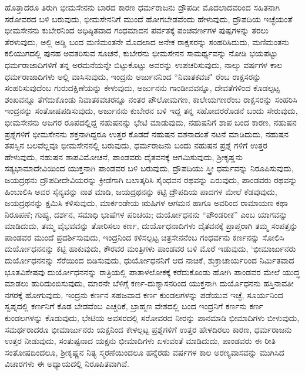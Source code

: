 ಹೊತ್ತಾದರೂ ತಿರುಗಿ ಭೀಮಸೇನನು ಬಾರದ ಕಾರಣ ಧರ್ಮರಾಜನು ದ್ರೌಪದೀ ಮೊದಲಾದವರಿಂದ ಸಹಿತನಾಗಿ ಸರೋವರದ ಬಳಿ ಬರುವುದು, ಭೀಮಸೇನನಿಗೆ ಮುಂದೆ ಹೋಗಬೇಡವೆಂದು ಹೇಳುವುದು, ದ್ರೌಪದಿಯ ಇಚ್ಛೆಯಂತೆ ಭೀಮಸೇನನು ಕುಬೇರನಿಂದ ಅಧಿಷ್ಠಿತವಾದ ಗಂಧಮಾದನ ಪರ್ವತಕ್ಕೆ ಪಂಚವರ್ಣಗಳ ಪುಷ್ಪಗಳನ್ನು ತರಲು ತೆರಳುವುದು, ಅಲ್ಲಿ ಅಡ್ಡಿ ಬಂದ ಮಣಿಮಂತನೇ ಮೊದಲಾದ ಅನೇಕ ರಾಕ್ಷಸರನ್ನು ಸಂಹರಿಸಿದುದು, ಮಣಿಮಂತನು ಕಲಿಯುಗದಲ್ಲಿ ಪುನಹ ಅವತರಿಸುವ ಸೂಚನೆ, ಕುಬೇರನು ಭೀಮಸೇನನ ಸಾಮರ್ಥ್ಯವನ್ನು ನೋಡಿ ಭಯಪಟ್ಟು ಧರ್ಮರಾಜಾದಿಗಳಿಗೆ ತನ್ನ ಅರಮನೆಯನ್ನೇ ಬಿಟ್ಟುಕೊಟ್ಟು ಅವರನ್ನು ಉಪಚರಿಸುವುದು, ನಾಲ್ಕು ವರ್ಷಗಳ ಕಾಲ ಧರ್ಮರಾಜಾದಿಗಳು ಅಲ್ಲಿ ವಾಸಿಸುವುದು, ಇಂದ್ರನು ಅರ್ಜುನನಿಂದ “ನಿವಾತಕವಚ" ರೆಂಬ ರಾಕ್ಷಸರನ್ನು ಸಂಹರಿಸುವುದೆಂಬ ಗುರುದಕ್ಷಿಣೆಯನ್ನು ಕೇಳುವುದು, ಅರ್ಜುನನು ಗಾಂಡೀವವನ್ನೂ, ದೇವತೆಗಳಿಂದ ಕೊಡಲ್ಪಟ್ಟ ಶಂಖವನ್ನೂ ತೆಗೆದುಕೊಂಡು ನಿವಾತಕವಚರನ್ನೂ ನಂತರ ಪೌಲೋಮಗಣ, ಕಾಲೇಯಗಣರೆಂಬ ರಾಕ್ಷಸರನ್ನು ಸಂಹರಿಸಿ ಇಂದ್ರನನ್ನು ಸಂತೋಷಪಡಿಸುವುದು, ಅರ್ಜುನನು ಕುಬೇರನ ಬಳಿ ಇದ್ದ ತನ್ನ ಸಹೋದರರೊಡನೆ ಬಂದು ಸೇರುವುದು, ಭೀಮಸೇನನು ಅಜಗರ ರೂಪದಲ್ಲಿದ್ದ ನಹುಷನನ್ನು ಭೇಟಿ ಮಾಡುವುದು, ನಹುಷನಿಗೆ ಶಾಪ ಬಂದ ಕಾರಣ, ನಹುಷನ ಪ್ರಶ್ನೆಗಳಿಗೆ ಭೀಮಸೇನನು ಶಕ್ತನಾಗಿದ್ದರೂ ಉತ್ತರ ಕೊಡದೆ ನಹುಷನ ವಶನಾದಂತೆ ನಟನೆ ಮಾಡಿದುದು, ನಹುಷನ ತಪಸ್ಸಿನ ಬಲವೆಲ್ಲವೂ ಭೀಮಸೇನನಲ್ಲಿ ಬರುವುದು, ಧರ್ಮರಾಜನು ಬಂದು ನಹುಷನ ಪ್ರಶ್ನೆ ಗಳಿಗೆ ಉತ್ತರ ಹೇಳುವುದು, ನಹುಷನ ಶಾಪವಿಮೋಚನೆ, ಪಾಂಡವರು ದೈತವನಕ್ಕೆ ಆಗಮಿಸುವುದು, ಶ‍್ರೀಕೃಷ್ಣನು ಸತ್ಯಭಾಮಾದೇವಿಯಿಂದ ಯುಕ್ತನಾಗಿ ಪಾಂಡವರ ಬಳಿ ಬರುವುದು, ದ್ರೌಪದಿಯು ಸ್ತ್ರೀ ಧರ್ಮವನ್ನು ನಿರೂಪಿಸುವುದು, ಜಯದ್ರಥನು ದ್ರೌಪದೀದೇವಿಯರನ್ನು ಕ್ರೀಡೆಗಾಗಿ ಬಲಾತ್ಕರಿಸಿ ಸೈಂಧವನ ರಥವನ್ನು ಏರುವುದು, ಪಾಂಡವರು ರಥವನ್ನು ಹಿಂಬಾಲಿಸಿ ಅವರ ಸೈನ್ಯವನ್ನು ನಾಶ ಮಾಡಿ, ಜಯದ್ರಥನನ್ನು ಕಟ್ಟಿ ದ್ರೌಪದಿಯ ಪಾದಗಳ ಮೇಲೆ ಕೆಡವುವುದು, ಜಯದ್ರಥನನ್ನು ಕ್ಷಮಿಸಿ ಕಳಿಸುವುದು, ಮಾರ್ಕಂಡೇಯ ಋಷಿಗಳ ಆಗಮನ ಹಾಗೂ ಅವರಿಂದ ರಾಮಾಯಣ ಕಥಾ ನಿರೂಪಣೆ; ಗುಹ್ಯ, ದರ್ಶನ, ಸಮಾಧಿ ಭಾಷೆಗಳ ಪರಿಚಯ; ದುರ್ಯೋಧನನು “ಪೌಂಡರೀಕ” ಎಂಬ ಯಾಗವನ್ನು ಮಾಡಿದುದು, ತಮ್ಮ ವೈಭವವನ್ನು ತೋರಿಸಲು ಕರ್ಣ, ದುರ್ಯೊಧನಾದಿಗಳು ದೈತವನಕ್ಕೆ ಪ್ರಾಪ್ತರಾಗಿ ತಮ್ಮ ಸಂಪತ್ತನ್ನು ಪಾಂಡವರ ಮುಂದೆ ಪ್ರದರ್ಶಿಸುವುದು, ಇಂದ್ರನಿಂದ ಕಳಿಸಲ್ಪಟ್ಟ ಚಿತ್ರಸೇನನೆಂಬ ಗಂಧರ್ವನು ಕರ್ಣನನ್ನು ಸೋಲಿಸಿ ದುರ್ಯೋಧನನನ್ನು ಕಟ್ಟಿ ಹಾಕುವುದು, ಕೌರವರ ಮಂತ್ರಿಗಳು ಪಾಂಡವರ ಬಳಿ ಮೊರೆ ಇಡುವುದು, `ಭೀಮಾರ್ಜುನರು ದುರ್ಯೋಧನನನ್ನು ಸೆರೆಯಿಂದ ಬಿಡಿಸುವುದು, ಧುರ್ಯೋಧನನಿಗೆ ಆದ ನಾಚಿಕೆ, ಶುಕ್ರಾಚಾರ್ಯರಿಂದ ನಿರ್ಮಿತವಾದ ಭೂತವಿಶೇಷವು ದುರ್ಯೋಧನನನ್ನು ರಾತ್ರಿಯಲ್ಲಿ ಪಾತಾಳಲೋಕಕ್ಕೆ ಕರೆದುಕೊಂಡು ಹೋಗಿ ಪಾಂಡವರ ಮೇಲೆ ಯುದ್ಧ ಮಾಡಲು ಹುರಿದುಂಬಿಸುವುದು, ಮಾರನೇ ಬೆಳಿಗ್ಗೆ ಕರ್ಣ-ದುಶ್ಯಾಸನರಿಂದ ಯುಕ್ತನಾಗಿ ದುರ್ಯೊಧನನು ಹಸ್ತಿನಾವತೀ ನಗರಕ್ಕೆ ಹೋಗುವುದು, ಇಂದ್ರನು ಕರ್ಣನ ಸಹಜವಾದ ಕರ್ಣ ಕುಂಡಲಗಳನ್ನು ಪಡೆಯುವ ಇಚ್ಛೆ, ಸೂರ್ಯನಿಂದ ಸ್ವಪ್ನದಲ್ಲಿ ಕರ್ಣನಿಗೆ ಕೊಡ ಬೇಡವೆಂಬ ಎಚ್ಚರಿಕೆ, ಬ್ರಾಹ್ಮಣ ವೇಶದಲ್ಲಿ ಬಂದ ಇಂದ್ರನಿಗೆ ಕರ್ಣನು ಕರ್ಣ ಕುಂಡಲಗಳನ್ನು ಕೊಡುವುದು, ಭೇಟಿಯ ಅವಸರದಲ್ಲಿ ಸರೋವರದ ನೀರನ್ನು ಪಾನಮಾಡಿ ಭೀಮಾದಿಗಳು ಬೀಳುವುದು, ಸಮರ್ಥರಾದರೂ ಭೀಮಾರ್ಜುನರು ಯಕ್ಷನಿಂದ ಕೇಳಲ್ಪಟ್ಟ ಪ್ರಶ್ನೆಗಳಿಗೆ ಉತ್ತರ ಹೇಳದಿರಲು ಕಾರಣ, ಧರ್ಮರಾಜನು ಉತ್ತರ ನೀಡುವುದು, ಸಂತುಷ್ಟನಾದ ಯಕ್ಷನು ಭೀಮಾದಿಗಳು ಏಳುವಂತೆ ಮಾಡಿದುದು, ಪಾಂಡವರು ಈ ರೀತಿ ಸಂತೋಷದಿಂದಲೂ, ಶ‍್ರೀಕೃಷ್ಣನ ನಿತ್ಯ ಸ್ಮರಣೆಯಿಂದಲೂ ಹನ್ನೆರಡು ವರ್ಷಗಳ ಕಾಲ ಅರಣ್ಯವಾಸವನ್ನು ಮುಗಿಸಿದ ವಿಚಾರಗಳು ಈ ಅಧ್ಯಾಯದಲ್ಲಿ ನಿರೂಪಿತವಾಗಿವೆ.


